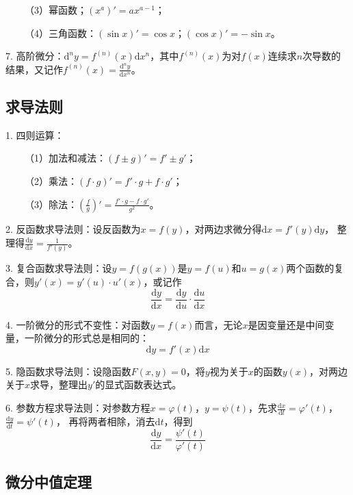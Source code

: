~~~~（3）幂函数；$\left(x^a\right)'=ax^{a-1}$；

~~~~（4）三角函数：$(\sin x)'=\cos x$；$(\cos x)'=-\sin x$。

7. 高阶微分：$\mathrm{d}^n y =f^{(n)}(x)\mathrm{d}x^n$，其中$f^{(n)}(x)$为对$f(x)$连续求$n$次导数的结果，又记作$f^{(n)}(x)=\frac{\mathrm{d}^n y}{\mathrm{d}x^n}$。

\subsection{求导法则}

1. 四则运算：

~~~~（1）加法和减法：$\left(f\pm g\right)'=f' \pm g'$；

~~~~（2）乘法：$(f\cdot g)'=f'\cdot g+f \cdot g'$；

~~~~（3）除法：$\left(\frac{f}{g}\right)'=\frac{f'\cdot g-f\cdot g'}{g^2}$。

2. 反函数求导法则：设反函数为$x=f(y)$，对两边求微分得$\mathrm{d}x=f'(y) \mathrm{d}y$，
整理得$\frac{\mathrm{d}y}{\mathrm{d}x}=\frac{1}{f'(y)}$。

3. 复合函数求导法则：设$y=f\left(g(x)\right)$是$y=f(u)$和$u=g(x)$两个函数的复合，则$y'(x)=y'(u)\cdot u'(x)$，或记作
\begin{equation*}
    \frac{\mathrm{d}y}{\mathrm{d}x}=\frac{\mathrm{d}y}{\mathrm{d}u}\cdot\frac{\mathrm{d}u}{\mathrm{d}x}
\end{equation*}

4. 一阶微分的形式不变性：对函数$y=f(x)$而言，无论$x$是因变量还是中间变量，一阶微分的形式总是相同的：
\begin{equation*}
    \mathrm{d}y=f'(x)\mathrm{d}x
\end{equation*}

5. 隐函数求导法则：设隐函数$F(x,y)=0$，将$y$视为关于$x$的函数$y(x)$，对两边关于$x$求导，整理出$y'$的显式函数表达式。

6. 参数方程求导法则：对参数方程$x=\varphi(t)$，$y=\psi (t)$，先求$\frac{\mathrm{d}x}{\mathrm{d}t}=\varphi'(t)$，$\frac{\mathrm{d}y}{\mathrm{d}t}=\psi'(t)$，
再将两者相除，消去$\mathrm{d}t$，得到
\begin{equation*}
    \frac{\mathrm{d}y}{\mathrm{d}x}=\frac{\psi'(t)}{\varphi'(t)}
\end{equation*}

\subsection{微分中值定理}

